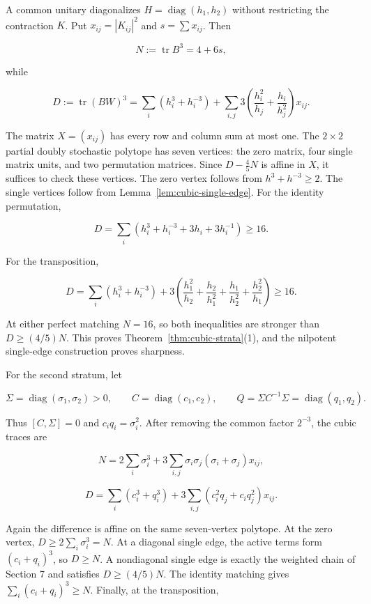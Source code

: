 \documentclass[11pt]{article}
\begin{document}
A common unitary diagonalizes $H=\operatorname{diag}(h_1,h_2)$ without
restricting the contraction $K$. Put $x_{ij}=|K_{ij}|^2$ and
$s=\sum x_{ij}$. Then

\[
N:=\operatorname{tr}B^3=4+6s,
\tag{8.8}\label{eq:8.8}
\]

while

\[
D:=\operatorname{tr}(BW)^3
=\sum_i(h_i^3+h_i^{-3})
+\sum_{i,j}3\left(\frac{h_i^2}{h_j}
+\frac{h_i}{h_j^2}\right)x_{ij}.
\tag{8.9}\label{eq:8.9}
\]

The matrix $X=(x_{ij})$ has every row and column sum at most one. The
$2\times2$ partial doubly stochastic polytope has seven vertices: the zero
matrix, four single matrix units, and two permutation matrices. Since
$D-\frac45N$ is affine in $X$, it suffices to check these vertices. The zero
vertex follows from $h^3+h^{-3}\ge2$. The single vertices follow from
Lemma~\ref{lem:cubic-single-edge}. For the identity permutation,

\[
D=\sum_i(h_i^3+h_i^{-3}+3h_i+3h_i^{-1})\ge16.
\tag{8.10}\label{eq:8.10}
\]

For the transposition,

\[
D=\sum_i(h_i^3+h_i^{-3})+
3\left(\frac{h_1^2}{h_2}+\frac{h_2}{h_1^2}
+\frac{h_1}{h_2^2}+\frac{h_2^2}{h_1}\right)\ge16.
\tag{8.11}\label{eq:8.11}
\]

At either perfect matching $N=16$, so both inequalities are stronger than
$D\ge(4/5)N$. This proves Theorem~\ref{thm:cubic-strata}(1), and the nilpotent single-edge
construction proves sharpness.

For the second stratum, let

\[
\Sigma=\operatorname{diag}(\sigma_1,\sigma_2)>0,\qquad
C=\operatorname{diag}(c_1,c_2),\qquad
Q=\Sigma C^{-1}\Sigma=\operatorname{diag}(q_1,q_2).
\tag{8.12}\label{eq:8.12}
\]

Thus $[C,\Sigma]=0$ and $c_iq_i=\sigma_i^2$. After removing the common
factor $2^{-3}$, the cubic traces are

\[
N=2\sum_i\sigma_i^3+
3\sum_{i,j}\sigma_i\sigma_j(\sigma_i+\sigma_j)x_{ij},
\tag{8.13}\label{eq:8.13}
\]

\[
D=\sum_i(c_i^3+q_i^3)+
3\sum_{i,j}(c_i^2q_j+c_iq_j^2)x_{ij}.
\tag{8.14}\label{eq:8.14}
\]

Again the difference is affine on the same seven-vertex polytope. At the zero
vertex, $D\ge2\sum_i\sigma_i^3=N$. At a diagonal single edge, the active
terms form $(c_i+q_i)^3$, so $D\ge N$. A nondiagonal single edge is exactly
the weighted chain of Section 7 and satisfies $D\ge(4/5)N$. The identity
matching gives $\sum_i(c_i+q_i)^3\ge N$. Finally, at the transposition,
\end{document}
